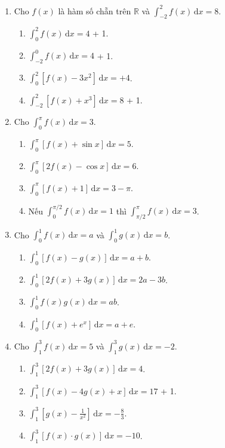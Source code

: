 \documentclass[12pt]{article}
\begin{document}
\begin{enumerate}[label=\textbf{Câu \arabic*.}]
		\item Cho $f(x)$ là hàm số chẵn trên $\mathbb{R}$ và $\displaystyle \int_{-2}^2 f(x)\,\mathrm{d}x = 8$.
		\begin{enumerate}[label=\alph*)]			\item $\displaystyle \int_{0}^2 f(x)\,\mathrm{d}x = 4$ + 1.
			\item $\displaystyle \int_{-2}^0 f(x)\,\mathrm{d}x = 4$ + 1.
			\item $\displaystyle \int_{0}^2 [f(x) - 3x^2]\,\mathrm{d}x = +4$.
			\item $\displaystyle \int_{-2}^2 [f(x) + x^3]\,\mathrm{d}x = 8$ + 1.
\end{enumerate}
		
		\item Cho $\displaystyle \int_0^{\pi} f(x)\,\mathrm{d}x = 3$.
		\begin{enumerate}[label=\alph*)]			\item $\displaystyle \int_0^{\pi} [f(x) + \sin x]\,\mathrm{d}x = 5$.
			\item $\displaystyle \int_0^{\pi} [2f(x) - \cos x]\,\mathrm{d}x = 6$.
			\item $\displaystyle \int_0^{\pi} [f(x) + 1]\,\mathrm{d}x = 3 - \pi$.
			\item Nếu $\displaystyle \int_0^{\pi/2} f(x)\,\mathrm{d}x = 1$ thì $\displaystyle \int_{\pi/2}^{\pi} f(x)\,\mathrm{d}x = 3$.
\end{enumerate}
		
		\item Cho $\displaystyle \int_0^1 f(x)\,\mathrm{d}x = a$ và $\displaystyle \int_0^1 g(x)\,\mathrm{d}x = b$.
		\begin{enumerate}[label=\alph*)]			\item $\displaystyle \int_0^1 [f(x) - g(x)]\,\mathrm{d}x = a + b$.
			\item $\displaystyle \int_0^1 [2f(x) + 3g(x)]\,\mathrm{d}x = 2a - 3b$.
			\item $\displaystyle \int_0^1 f(x)g(x)\,\mathrm{d}x = ab$.
			\item $\displaystyle \int_0^1 [f(x) + e^x]\,\mathrm{d}x = a + e$.
\end{enumerate}

		\item Cho $\displaystyle \int_1^3 f(x)\,\mathrm{d}x = 5$ và $\displaystyle \int_1^3 g(x)\,\mathrm{d}x = -2$.
		\begin{enumerate}[label=\alph*)]			\item $\displaystyle \int_1^3 [2f(x) + 3g(x)]\,\mathrm{d}x = 4$.
			\item $\displaystyle \int_1^3 [f(x) - 4g(x) + x]\,\mathrm{d}x = 17$ + 1.
			\item $\displaystyle \int_1^3 \left[g(x) - \frac{1}{x^2}\right]\,\mathrm{d}x = -\frac{8}{3}$.
			\item $\displaystyle \int_1^3 [f(x) \cdot g(x)]\,\mathrm{d}x = -10$.
\end{enumerate}
		

\end{enumerate}
\end{document}
